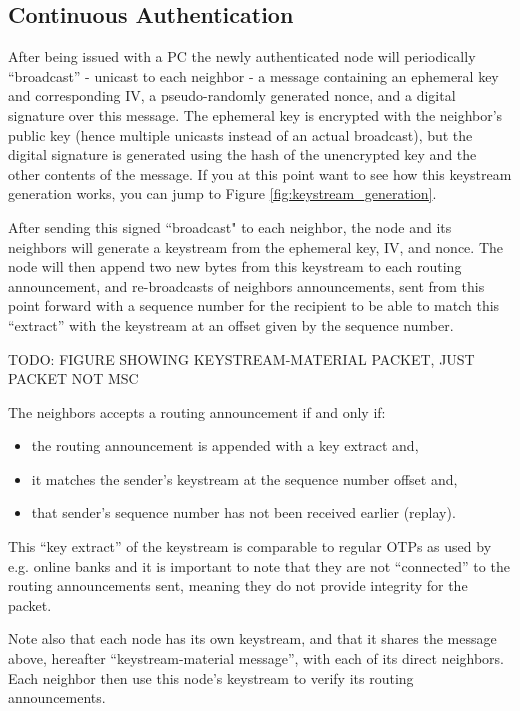 \subsection{Continuous Authentication}
After being issued with a \ac{PC} the newly authenticated node will periodically
``broadcast'' - unicast to each neighbor - a message containing an ephemeral key
and corresponding \ac{IV}, a pseudo-randomly generated nonce, and a digital
signature over this message. The ephemeral key is encrypted with the neighbor's
public key (hence multiple unicasts instead of an actual broadcast), but the
digital signature is generated using the hash of the unencrypted key and the
other contents of the message. If you at this point want to see how this
keystream generation works, you can jump to Figure
\ref{fig:keystream_generation}.

After sending this signed ``broadcast" to each neighbor, the node and its
neighbors will generate a keystream from the ephemeral key, \ac{IV}, and nonce.
The node will then append two new bytes from this keystream to each routing
announcement, and re-broadcasts of neighbors announcements, sent from this point
forward with a sequence number for the recipient to be able to match this
``extract'' with the keystream at an offset given by the sequence number.

TODO: FIGURE SHOWING KEYSTREAM-MATERIAL PACKET, JUST PACKET NOT MSC

The neighbors accepts a routing announcement if and only if:

\begin{itemize}
  \item the routing announcement is appended with a key extract and,
  \item it matches the sender's keystream at the sequence number offset and,
  \item that sender's sequence number has not been received earlier (replay).
\end{itemize}

This ``key extract'' of the keystream is comparable to regular \acp{OTP} as used
by e.g. online banks and it is important to note that they are not ``connected''
to the routing announcements sent, meaning they do not provide integrity for the
packet.

Note also that each node has its own keystream, and that it shares the message
above, hereafter ``keystream-material message'', with each of its direct
neighbors. Each neighbor then use this node's keystream to verify its routing
announcements.

